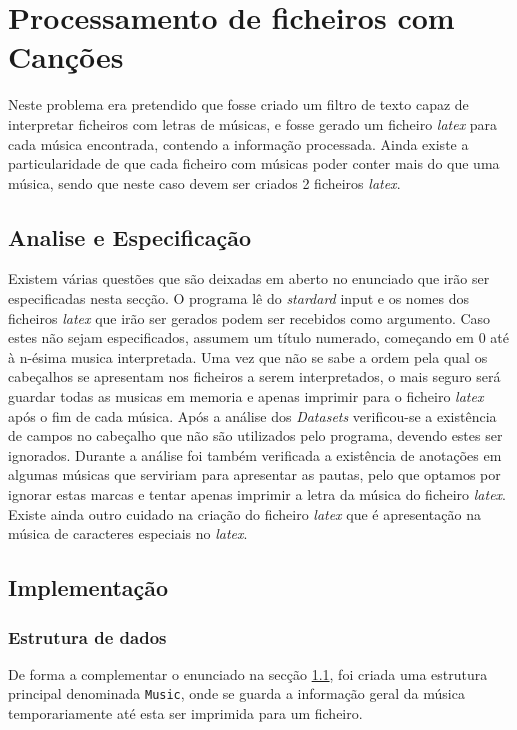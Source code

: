 \chapter{Processamento de ficheiros com Canções}
\label{cap:music}
Neste problema era pretendido que fosse criado um filtro de texto capaz de interpretar ficheiros com letras de músicas, e fosse gerado um ficheiro \emph{latex} para cada música encontrada, contendo a informação processada.
Ainda existe a particularidade de que cada ficheiro com músicas poder conter mais do que uma música, sendo que neste caso devem ser criados 2 ficheiros \emph{latex}.

\section{Analise e Especificação}
\label{seq:music-ana}
Existem várias questões que são deixadas em aberto no enunciado que irão ser especificadas nesta secção. 
O programa lê do \emph{stardard} input e os nomes dos ficheiros \emph{latex} que irão ser gerados podem ser recebidos como argumento. Caso estes não sejam especificados, assumem um título numerado, começando em 0 até à n-ésima musica interpretada. 
Uma vez que não se sabe a ordem pela qual os cabeçalhos se apresentam nos ficheiros a serem interpretados, o mais seguro será guardar todas as musicas em memoria e apenas imprimir para o ficheiro \emph{latex} após o fim de cada música.
Após a análise dos \emph{Datasets} verificou-se a existência de campos no cabeçalho que não são utilizados pelo programa, devendo estes ser ignorados.
Durante a análise foi também verificada a existência de anotações em algumas músicas que serviriam para apresentar as pautas, pelo que optamos por ignorar estas marcas e tentar apenas imprimir a letra da música do ficheiro \emph{latex}.
Existe ainda outro cuidado na criação do ficheiro \emph{latex} que é apresentação na música de caracteres especiais no \emph{latex}.

\section{Implementação}
\label{seq:music-imp}

\subsection{Estrutura de dados}
\label{seq:music-est}
De forma a complementar o enunciado na secção \ref{seq:music-ana}, foi criada uma estrutura principal denominada \verb!Music!, onde se guarda a informação geral da música temporariamente até esta ser imprimida para um ficheiro.

